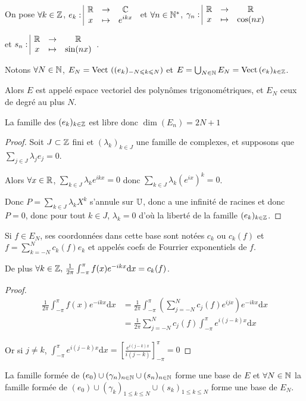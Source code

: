 On pose $\forall k \in \mathbb{Z}$, $e_k: \space \begin{array}{|ccc} \displaystyle \mathbb{R} & \to & \displaystyle \mathbb{C} \\ \displaystyle x & \mapsto & \displaystyle e^{ikx} \end{array}$ 
et $\forall n \in \mathbb{N}^*$, $\gamma_n: \space \begin{array}{|ccc} \displaystyle \mathbb{R} & \to & \displaystyle \mathbb{R} \\ \displaystyle x & \mapsto & \displaystyle \cos(nx) \end{array}$ 

et 
$s_n: \space \begin{array}{|ccc} \displaystyle \mathbb{R} & \to & \displaystyle \mathbb{R} \\ \displaystyle x & \mapsto & \displaystyle \sin(nx) \end{array}$.


Notons $\forall N \in \mathbb{N}$, $E_N = \operatorname{Vect} \,\left( (e_k)_{-N \leqslant k \leqslant N} \right)$ et 
$E = \bigcup_{N \in \mathbb{N}} E_N = \operatorname{Vect} \,(e_k)_{k \in \mathbb{Z}}$.

Alors $E$ est appelé espace vectoriel des polynômes trigonométriques, et 
$E_N$ ceux de degré au plus $N$.

La famille des $(e_k)_{k \in \mathbb{Z}}$ est libre donc $\dim(E_n) = 2N + 1$ 

\begin{proof}
    Soit $J \subset \mathbb{Z}$ fini et $(\lambda_k)_{k \in J}$ une famille de complexes, et supposons que 
     $\sum_{j \in J} \lambda_j e_j = 0$. 

     Alors $\forall x \in \mathbb{R}$, $\sum_{k \in J} \lambda_k e^{ikx} = 0$ 
    donc $\sum_{k \in J} \lambda_k (e^{ix}) ^k = 0$.

    Donc $P = \sum_{k \in J} \lambda_k X^k$ s'annule sur $\mathbb{U}$, donc a une 
    infinité de racines et donc $P = 0$, donc pour tout $k \in J$, $\lambda_k = 0$
    d'où la liberté de la famille $(e_k)_{k \in \mathbb{Z}}$.
\end{proof}

Si $f \in E_N$, ses coordonnées dans cette base sont notées $c_k$ ou $c_k(f)$ et 
$\displaystyle f = \sum_{k=-N}^N c_k(f) e_k$ et appelés coefs de Fourrier exponentiels 
de $f$.

De plus $\forall k \in \mathbb{Z}, \, \frac 1 {2 \pi} \int_{- \pi }^\pi f(x) e^{-ikx} \mathrm{d}x = c_k(f)$.

\begin{proof}
    \begin{align}
        \frac 1 {2 \pi} \int_{- \pi }^\pi f(x) e^{-ikx} \mathrm{d}x & = \frac 1 {2 \pi} \int_{- \pi }^\pi \left( \sum_{j=-N}^N c_j(f) e^{ijx} \right) e^{-ikx} \mathrm{d}x \\
        & = \frac 1 {2 \pi} \sum_{j=-N}^N c_j(f) \int_{- \pi }^\pi e^{i(j-k)x} \mathrm{d}x 
    \end{align}

    Or si $j \neq k$, $\int_{- \pi }^\pi e^{i(j-k)x} \mathrm{d}x = \left[ \frac{e^{i(j-k)x}}{i(j-k)} \right]_{- \pi }^\pi = 0$
\end{proof}

La famille formée de $(e_0) \cup (\gamma_n)_{n \in \mathbb{N}} \cup (s_n)_{n \in \mathbb{N}}$ forme une base de $E$ et 
$\forall N \in \mathbb{N}$ la famille formée de $(e_0) \cup (\gamma_k)_{1 \leqslant k \leqslant N} \cup (s_k)_{1 \leqslant k \leqslant N}$
forme une base de $E_N$.


